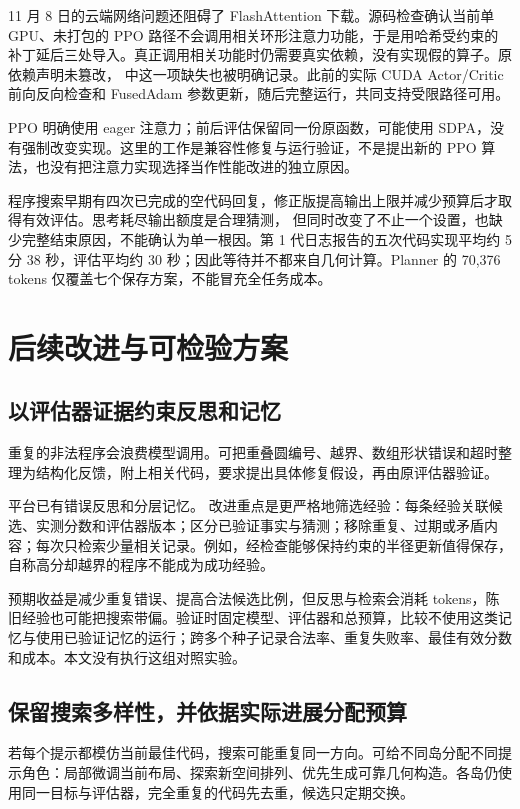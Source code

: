 11 月 8 日的云端网络问题还阻碍了 FlashAttention 下载。源码检查确认当前单 GPU、未打包的 PPO 路径不会调用相关环形注意力功能，于是用哈希受约束的补丁延后三处导入。真正调用相关功能时仍需要真实依赖，没有实现假的算子。原依赖声明未篡改， 中这一项缺失也被明确记录。此前的实际 CUDA Actor/Critic 前向反向检查和 FusedAdam 参数更新，随后完整运行，共同支持受限路径可用。

PPO 明确使用 eager 注意力；前后评估保留同一份原函数，可能使用 SDPA，没有强制改变实现。这里的工作是兼容性修复与运行验证，不是提出新的 PPO 算法，也没有把注意力实现选择当作性能改进的独立原因。

程序搜索早期有四次已完成的空代码回复，修正版提高输出上限并减少预算后才取得有效评估。思考耗尽输出额度是合理猜测，\cite{deepseek} 但同时改变了不止一个设置，也缺少完整结束原因，不能确认为单一根因。第 1 代日志报告的五次代码实现平均约 5 分 38 秒，评估平均约 30 秒；因此等待并不都来自几何计算。Planner 的 70,376 tokens 仅覆盖七个保存方案，不能冒充全任务成本。

\section{后续改进与可检验方案}
\subsection{以评估器证据约束反思和记忆}
重复的非法程序会浪费模型调用。可把重叠圆编号、越界、数组形状错误和超时整理为结构化反馈，附上相关代码，要求提出具体修复假设，再由原评估器验证。

平台已有错误反思和分层记忆。\cite{memory} 改进重点是更严格地筛选经验：每条经验关联候选、实测分数和评估器版本；区分已验证事实与猜测；移除重复、过期或矛盾内容；每次只检索少量相关记录。例如，经检查能够保持约束的半径更新值得保存，自称高分却越界的程序不能成为成功经验。

预期收益是减少重复错误、提高合法候选比例，但反思与检索会消耗 tokens，陈旧经验也可能把搜索带偏。验证时固定模型、评估器和总预算，比较不使用这类记忆与使用已验证记忆的运行；跨多个种子记录合法率、重复失败率、最佳有效分数和成本。本文没有执行这组对照实验。

\subsection{保留搜索多样性，并依据实际进展分配预算}
若每个提示都模仿当前最佳代码，搜索可能重复同一方向。可给不同岛分配不同提示角色：局部微调当前布局、探索新空间排列、优先生成可靠几何构造。各岛仍使用同一目标与评估器，完全重复的代码先去重，候选只定期交换。

